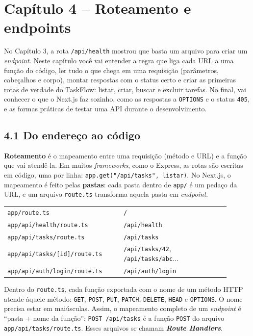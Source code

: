 \section{Capítulo 4 -- Roteamento e endpoints}

No Capítulo 3, a rota \texttt{/api/health} mostrou que basta um arquivo para criar um \textit{endpoint}. Neste capítulo você vai entender a regra que liga cada URL a uma função do código, ler tudo o que chega em uma requisição (parâmetros, cabeçalhos e corpo), montar respostas com o status certo e criar as primeiras rotas de verdade do TaskFlow: listar, criar, buscar e excluir tarefas. No final, vai conhecer o que o Next.js faz sozinho, como as respostas a \texttt{OPTIONS} e o status \texttt{405}, e as formas práticas de testar uma API durante o desenvolvimento.

\subsection{4.1 Do endereço ao código}

\textbf{Roteamento} é o mapeamento entre uma requisição (método e URL) e a função que vai atendê-la. Em muitos \textit{frameworks}, como o Express, as rotas são escritas em código, uma por linha: \texttt{app.get("/api/tasks", listar)}. No Next.js, o mapeamento é feito pelas \textbf{pastas}: cada pasta dentro de \texttt{app/} é um pedaço da URL, e um arquivo \texttt{route.ts} transforma aquela pasta em \textit{endpoint}.

\begin{center}
\begin{tabular}{@{}P{0.47\linewidth}P{0.43\linewidth}@{}}
\toprule
{}
 &  \\
\midrule
\texttt{app/route.ts} & \texttt{/} \\
 \texttt{app/api/health/route.ts} & \texttt{/api/health} \\
\texttt{app/api/tasks/route.ts} & \texttt{/api/tasks} \\
 \texttt{app/api/tasks/[id]/route.ts} & \texttt{/api/tasks/42}, \texttt{/api/tasks/abc}... \\
\texttt{app/api/auth/login/route.ts} & \texttt{/api/auth/login} \\
\bottomrule
\end{tabular}
\end{center}

Dentro do \texttt{route.ts}, cada função exportada com o nome de um método HTTP atende àquele método: \texttt{GET}, \texttt{POST}, \texttt{PUT}, \texttt{PATCH}, \texttt{DELETE}, \texttt{HEAD} e \texttt{OPTIONS}. O nome precisa estar em maiúsculas. Assim, o mapeamento completo de um \textit{endpoint} é ``pasta + nome da função'': \texttt{POST /api/tasks} é a função \texttt{POST} do arquivo \texttt{app/api/tasks/route.ts}. Esses arquivos se chamam \textbf{\textit{Route Handlers}}.

